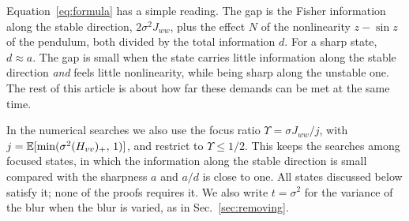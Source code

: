 Equation~\eqref{eq:formula} has a simple reading. The gap is the Fisher information along the stable direction, $2\sigma^2 J_{ww}$, plus the effect $N$ of the nonlinearity $z - \sin z$ of the pendulum, both divided by the total information $d$. For a sharp state, $d \approx a$. The gap is small when the state carries little information along the stable direction \emph{and} feels little nonlinearity, while being sharp along the unstable one. The rest of this article is about how far these demands can be met at the same time.

In the numerical searches we also use the focus ratio $\Upsilon = \sigma J_{ww}/j$, with $j = \mathbb{E}[\min(\sigma^2 (H_{vv})_+,\, 1)]$, and restrict to $\Upsilon \leq 1/2$. This keeps the searches among focused states, in which the information along the stable direction is small compared with the sharpness $a$ and $a/d$ is close to one. All states discussed below satisfy it; none of the proofs requires it. We also write $t = \sigma^2$ for the variance of the blur when the blur is varied, as in Sec.~\ref{sec:removing}.
